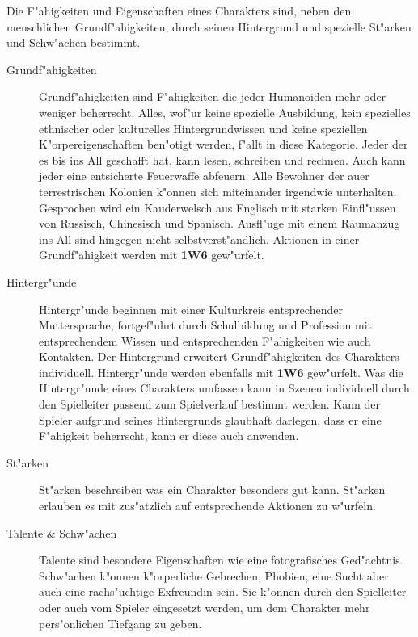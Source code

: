 
Die F"ahigkeiten und Eigenschaften eines Charakters sind, neben den menschlichen Grundf"ahigkeiten, durch seinen Hintergrund und spezielle St"arken und Schw"achen bestimmt. 

\begin{description}
    \item[Grundf"ahigkeiten] Grundf"ahigkeiten sind F"ahigkeiten die jeder Humanoiden mehr oder weniger beherrscht. Alles, wof"ur keine
        spezielle Ausbildung, kein spezielles ethnischer oder kulturelles Hintergrundwissen und keine speziellen K"orpereigenschaften ben"otigt werden, f"allt in diese Kategorie. Jeder der es bis ins All geschafft hat, kann lesen, schreiben und rechnen. Auch kann jeder eine entsicherte Feuerwaffe abfeuern. Alle Bewohner der au\3er terrestrischen Kolonien k"onnen sich miteinander irgendwie unterhalten. Gesprochen wird ein Kauderwelsch aus Englisch mit starken Einfl"ussen von Russisch, Chinesisch und Spanisch. Ausfl"uge mit einem Raumanzug ins All sind hingegen nicht selbstverst"andlich. Aktionen in einer Grundf"ahigkeit werden mit \textbf{1W6} gew"urfelt. 
    \item[Hintergr"unde] Hintergr"unde beginnen mit einer Kulturkreis entsprechender Muttersprache, fortgef"uhrt durch Schulbildung und 
        Profession mit entsprechendem Wissen und entsprechenden F"ahigkeiten wie auch Kontakten. Der Hintergrund erweitert Grundf"ahigkeiten des Charakters individuell. Hintergr"unde werden ebenfalls mit \textbf{1W6} gew"urfelt. Was die Hintergr"unde eines Charakters umfassen kann in Szenen individuell durch den Spielleiter passend zum Spielverlauf bestimmt werden. Kann der Spieler aufgrund seines Hintergrunds glaubhaft darlegen, dass er eine F"ahigkeit beherrscht, kann er diese auch anwenden.
    \item[St"arken] St"arken beschreiben was ein Charakter besonders gut kann. St"arken erlauben es mit zus"atzlich auf entsprechende 
        Aktionen zu w"urfeln. 
    \item[Talente \& Schw"achen] Talente sind besondere Eigenschaften wie eine fotografisches Ged"achtnis. Schw"achen k"onnen k"orperliche  
        Gebrechen, Phobien, eine Sucht aber auch eine rachs"uchtige Exfreundin sein. Sie k"onnen durch den Spielleiter oder auch vom Spieler eingesetzt werden, um dem Charakter mehr pers"onlichen Tiefgang zu geben.
\end{description}        
